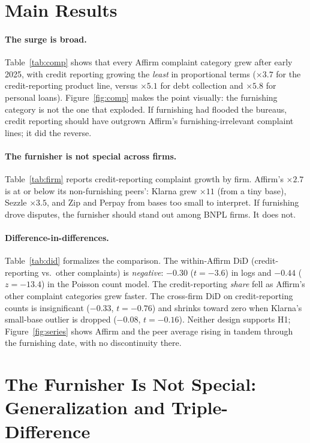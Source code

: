 \documentclass[12pt]{article}
\begin{document}
\section{Main Results}\label{sec:res}
\paragraph{The surge is broad.} Table~\ref{tab:comp} shows that every Affirm complaint category
grew after early 2025, with credit reporting growing the \emph{least} in proportional terms
($\times 3.7$ for the credit-reporting product line, versus $\times 5.1$ for debt collection and
$\times 5.8$ for personal loans). Figure~\ref{fig:comp} makes the point visually: the furnishing
category is not the one that exploded. If furnishing had flooded the bureaus, credit reporting
should have outgrown Affirm's furnishing-irrelevant complaint lines; it did the reverse.

\paragraph{The furnisher is not special across firms.} Table~\ref{tab:firm} reports
credit-reporting complaint growth by firm. Affirm's $\times 2.7$ is at or below its
non-furnishing peers': Klarna grew $\times 11$ (from a tiny base), Sezzle $\times 3.5$, and Zip
and Perpay from bases too small to interpret. If furnishing drove disputes, the furnisher should
stand out among BNPL firms. It does not.

\paragraph{Difference-in-differences.} Table~\ref{tab:did} formalizes the comparison. The
within-Affirm DiD (credit-reporting vs.\ other complaints) is \emph{negative}: $-0.30$
($t=-3.6$) in logs and $-0.44$ ($z=-13.4$) in the Poisson count model. The credit-reporting
\emph{share} fell as Affirm's other complaint categories grew faster. The cross-firm DiD on
credit-reporting counts is insignificant ($-0.33$, $t=-0.76$) and shrinks toward zero when
Klarna's small-base outlier is dropped ($-0.08$, $t=-0.16$). Neither design supports H1;
Figure~\ref{fig:series} shows Affirm and the peer average rising in tandem through the furnishing
date, with no discontinuity there.

\section{The Furnisher Is Not Special: Generalization and Triple-Difference}\label{sec:special}
\end{document}
